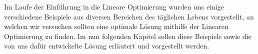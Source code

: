 Im Laufe der Einführung in die Lineare Optimierung wurden uns einige verschiedene Beispiele aus diversen Bereichen des täglichen Lebens vorgestellt, an welchen wir versuchen sollten eine optimale Lösung mithilfe der Linearen Optimierung zu finden. Im nun folgenden Kapitel sollen diese Beispiele sowie die von uns dafür entwickelte Lösung erläutert und vorgestellt werden.